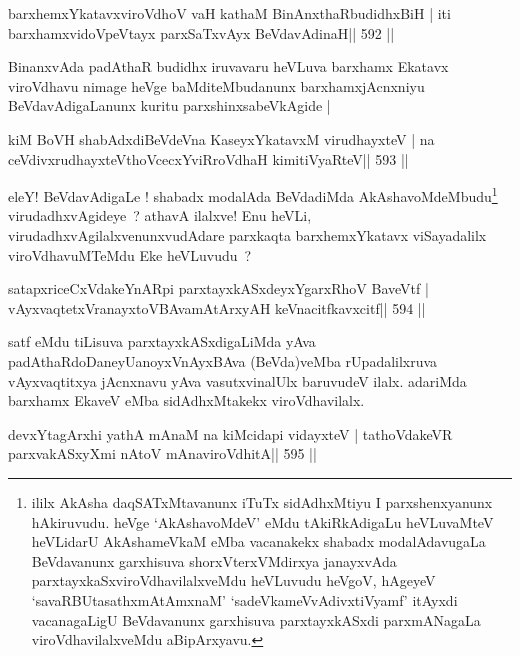 

\begin{shl}
barxhemxYkatavxviroVdhoV vaH kathaM BinAnxthaRbudidhxBiH |
iti barxhamxvidoVpeVtayx parxSaTxvAyx BeVdavAdinaH\hfill || 592 ||
\end{shl}

\begin{artha}
BinanxvAda padAthaR budidhx iruvavaru heVLuva barxhamx Ekatavx
viroVdhavu nimage heVge baMditeMbudanunx barxhamxjAcnxniyu
BeVdavAdigaLanunx kuritu parxshinxsabeVkAgide |
\end{artha}

\begin{shl}
kiM BoVH shabAdxdiBeVdeVna KaseyxYkatavxM virudhayxteV |
na ceVdivxrudhayxteV\s thoVcecxYviRroVdhaH kimitiVyaRteV\hfill || 593 ||
\end{shl}

\begin{artha}
eleY! BeVdavAdigaLe ! shabadx modalAda BeVdadiMda
AkAshavoMdeMbudu\footnote{ililx AkAsha daqSATxMtavanunx iTuTx
sidAdhxMtiyu I parxshenxyanunx hAkiruvudu. heVge `AkAshavoMdeV' eMdu
tAkiRkAdigaLu heVLuvaMteV heVLidarU AkAshameVkaM eMba vacanakekx
shabadx modalAdavugaLa BeVdavanunx garxhisuva shorxVterxVMdirxya
janayxvAda parxtayxkaSxviroVdhavilalxveMdu heVLuvudu heVgoV, hAgeyeV
`savaRBUtasathxmAtAmxnaM' `sadeVkameVvAdivxtiVyamf' itAyxdi
vacanagaLigU BeVdavanunx garxhisuva parxtayxkASxdi parxmANagaLa
viroVdhavilalxveMdu aBipArxyavu.} virudadhxvAgideye~? athavA ilalxve! Enu
heVLi, virudadhxvAgilalxvenunxvudAdare parxkaqta barxhemxYkatavx
viSayadalilx viroVdhavuMTeMdu Eke heVLuvudu~?
\end{artha}

\begin{shl}
satapxriceCxVdakeYnARpi parxtayxkASxdeyxYgarxRhoV BaveVtf |
vAyxvaqtetxVranayxtoVBAvamAtArxyAH keVnacitfkavxcitf\hfill || 594 ||
\end{shl}

\begin{artha}
satf eMdu tiLisuva parxtayxkASxdigaLiMda yAva padAthaRdoDaneyU\break anoyxVnAyxBAva (BeVda)veMba rUpadalilxruva vAyxvaqtitxya jAcnxnavu yAva vasutxvinalUlx baruvudeV ilalx. adariMda barxhamx EkaveV eMba sidAdhxMtakekx viroVdhavilalx.
\end{artha}

\begin{shl}
devxYtagArxhi yathA mAnaM na kiMcidapi vidayxteV |
tathoVdakeVR parxvakASxyXmi nAtoV mAnaviroVdhitA\hfill || 595 ||
\end{shl}

